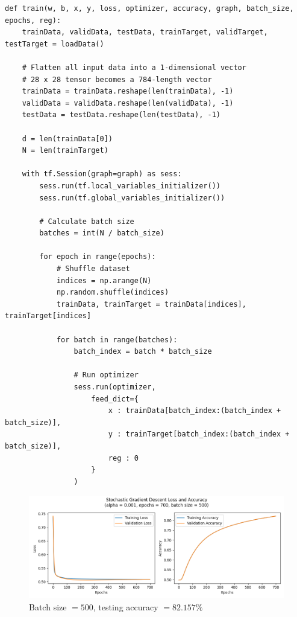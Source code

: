 \documentclass[letter]{article}
\begin{document}
\begin{lstlisting}
def train(w, b, x, y, loss, optimizer, accuracy, graph, batch_size, epochs, reg):
    trainData, validData, testData, trainTarget, validTarget, testTarget = loadData()

    # Flatten all input data into a 1-dimensional vector
    # 28 x 28 tensor becomes a 784-length vector
    trainData = trainData.reshape(len(trainData), -1)
    validData = validData.reshape(len(validData), -1)
    testData = testData.reshape(len(testData), -1)

    d = len(trainData[0])
    N = len(trainTarget)

    with tf.Session(graph=graph) as sess:
        sess.run(tf.local_variables_initializer())
        sess.run(tf.global_variables_initializer())

        # Calculate batch size
        batches = int(N / batch_size)

        for epoch in range(epochs):
            # Shuffle dataset
            indices = np.arange(N)
            np.random.shuffle(indices)
            trainData, trainTarget = trainData[indices], trainTarget[indices]

            for batch in range(batches):
                batch_index = batch * batch_size

                # Run optimizer
                sess.run(optimizer,
                    feed_dict={
                        x : trainData[batch_index:(batch_index + batch_size)], 
                        y : trainTarget[batch_index:(batch_index + batch_size)],
                        reg : 0
                    }
                )
\end{lstlisting}

\begin{figure}[H]
	\centering
	\includegraphics[width=\linewidth]{Figure_7}
	\caption{Batch size $ = 500$, testing accuracy $ = 82.157\%$}
	\label{fig:plot7}
\end{figure}
\end{document}
